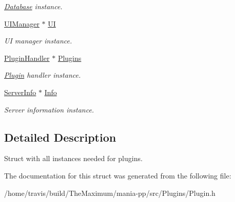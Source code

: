 \begin{DoxyCompactItemize}
\begin{DoxyCompactList}\small\item\em \hyperlink{classDatabase}{Database} instance. \end{DoxyCompactList}\item 
\hypertarget{structController_a6ff277dc9e9749bf599b240f93d413b9}{\hyperlink{classUIManager}{U\-I\-Manager} $\ast$ \hyperlink{structController_a6ff277dc9e9749bf599b240f93d413b9}{U\-I}}\label{structController_a6ff277dc9e9749bf599b240f93d413b9}

\begin{DoxyCompactList}\small\item\em U\-I manager instance. \end{DoxyCompactList}\item 
\hypertarget{structController_a03379cc27c876d10e9e8acb73d84deec}{\hyperlink{classPluginHandler}{Plugin\-Handler} $\ast$ \hyperlink{structController_a03379cc27c876d10e9e8acb73d84deec}{Plugins}}\label{structController_a03379cc27c876d10e9e8acb73d84deec}

\begin{DoxyCompactList}\small\item\em \hyperlink{classPlugin}{Plugin} handler instance. \end{DoxyCompactList}\item 
\hypertarget{structController_ac1dffd87d30ad42bdbcf294544f474da}{\hyperlink{structServerInfo}{Server\-Info} $\ast$ \hyperlink{structController_ac1dffd87d30ad42bdbcf294544f474da}{Info}}\label{structController_ac1dffd87d30ad42bdbcf294544f474da}

\begin{DoxyCompactList}\small\item\em Server information instance. \end{DoxyCompactList}\end{DoxyCompactItemize}


\subsection{Detailed Description}
Struct with all instances needed for plugins. 

The documentation for this struct was generated from the following file\-:\begin{DoxyCompactItemize}
\item 
/home/travis/build/\-The\-Maximum/mania-\/pp/src/\-Plugins/Plugin.\-h\end{DoxyCompactItemize}
